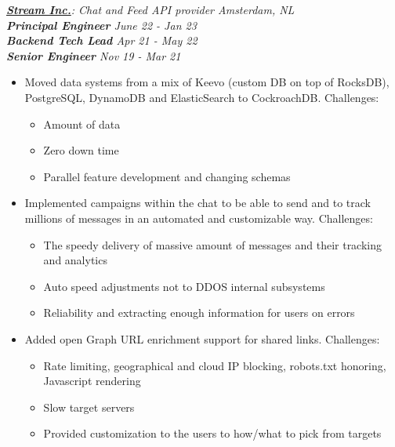 \documentclass[line, margin]{res}
\begin{document}
\begin{resume}
{\sl \textbf{\href{https://getstream.io}{Stream Inc.}}: Chat and Feed API provider \hfill Amsterdam, NL} \\
{\sl \textbf{Principal Engineer} \hfill June 22 - Jan 23} \\
{\sl \textbf{Backend Tech Lead} \hfill Apr 21 - May 22} \\
{\sl \textbf{Senior Engineer} \hfill Nov 19 - Mar 21} \\

\vspace{-0.3cm}
\begin{itemize} \itemsep -5pt
	\item{Moved data systems from a mix of Keevo (custom DB on top of RocksDB), PostgreSQL, DynamoDB and ElasticSearch to CockroachDB. Challenges:}
		\begin{itemize} \itemsep -5pt \small
		\vspace{-.2cm}
		\item Amount of data
		\item Zero down time
		\item Parallel feature development and changing schemas
		\end{itemize}
		
	\item{Implemented campaigns within the chat to be able to send and to track millions of messages in an automated and customizable way. Challenges:}
		\begin{itemize} \itemsep -5pt \small
		\vspace{-.2cm}
		\item The speedy delivery of massive amount of messages and their tracking and analytics
		\item Auto speed adjustments not to DDOS internal subsystems
		\item Reliability and extracting enough information for users on errors
		\end{itemize}
		
	\item{Added open Graph URL enrichment support for shared links. Challenges:}
		\begin{itemize} \itemsep -5pt \small
		\vspace{-.2cm}
		\item Rate limiting, geographical and cloud IP blocking, robots.txt honoring, Javascript rendering
		\item Slow target servers
		\item Provided customization to the users to how/what to pick from targets
		\end{itemize}
		

\end{itemize}
\end{resume}
\end{document}
